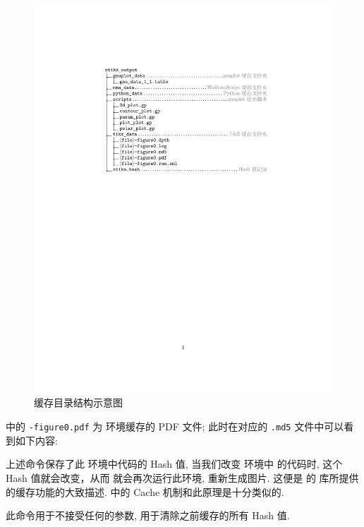 \documentclass[
  hyper, lang=cn, 
  class=l3dox, 
]{../../zlatex/code/ztex}
\begin{document}
\begin{figure}[!htb]
  \centering
  \includegraphics[width=.9\linewidth]{./support/pics/directory_tree_crop.pdf}
  \caption{\zTikZ{} 缓存目录结构示意图}
  \label{fig:zTikZ-directory}
\end{figure}

 中的 \texttt{-figure0.pdf} 为  环境缓存的 PDF 文件; 
此时在对应的 \texttt{.md5} 文件中可以看到如下内容:


\begin{DocExample}
\def \tikzexternallastkey {AE7F2539E81C96848ADCCEE3994993D1}%
\end{DocExample}
\resetExampleUR


上述命令保存了此  环境中代码的 Hash 值, 当我们改变  环境中
的代码时, 这个 Hash 值就会改变，从而 \TikZ{} 就会再次运行此环境, 重新生成图片. 这便是 \TikZ{} 的
 库所提供的缓存功能的大致描述. \zTikZ{} 中的 Cache 机制和此原理是十分类似的.


\begin{function}[added=2025-05-15]{\ztikzHashClean}
  此命令用于不接受任何的参数, 用于清除之前缓存的所有 Hash 值.
\end{function}
\end{document}
